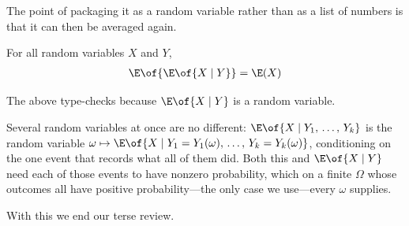 The point of packaging it as a random variable rather than as a list of numbers is that it can then be averaged again.

\begin{boxtheorem}
    For all random variables $X$ and $Y$,
    \begin{align*}
        \E\of{\E\of{X \mid Y}} = \E(X)
    \end{align*}
\end{boxtheorem}

The above type-checks because $\E\of{X \mid Y}$ is a random variable.

Several random variables at once are no different: $\E\of{X \mid Y_1, \, \ldots, \, Y_k}$ is the random variable $\omega \mapsto \E\of{X \mid Y_1 = Y_1(\omega), \, \ldots, \, Y_k = Y_k(\omega)}$, conditioning on the one event that records what all of them did. Both this and $\E\of{X \mid Y}$ need each of those events to have nonzero probability, which on a finite $\Omega$ whose outcomes all have positive probability---the only case we use---every $\omega$ supplies.

With this we end our terse review.
